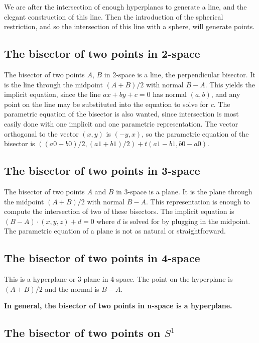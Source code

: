 \documentclass[12pt]{article}
\begin{document}
We are after the intersection of enough hyperplanes to generate a line,
and the elegant construction of this line.
Then the introduction of the spherical restriction, and so the intersection
of this line with a sphere, will generate points.

\clearpage

\subsection{The bisector of two points in 2-space}

The bisector of two points $A$, $B$ in 2-space is a line, the perpendicular bisector.
It is the line through the midpoint $(A+B)/2$ with normal $B-A$.
This yields the implicit equation, since the line $ax+by+c=0$ has normal $(a,b)$, 
and any point on the line may be substituted into the equation to solve for $c$.
The parametric equation of the bisector is also wanted, since intersection is
most easily done with one implicit and one parametric representation.
The vector orthogonal to the vector $(x,y)$ is $(-y,x)$, so the parametric equation
of the bisector is $((a0+b0)/2, (a1+b1)/2) + t(a1-b1,b0-a0)$.

\subsection{The bisector of two points in 3-space} 

The bisector of two points $A$ and $B$ in 3-space is a plane.
It is the plane through the midpoint $(A+B)/2$ with normal $B-A$.
This representation is enough to compute the intersection of two of these bisectors.
The implicit equation is $(B-A) \cdot (x,y,z) + d = 0$ where $d$ is solved for by plugging
in the midpoint.
The parametric equation of a plane is not as natural or straightforward.

\subsection{The bisector of two points in 4-space}

This is a hyperplane or 3-plane in 4-space.
The point on the hyperplane is $(A+B)/2$ and the normal is $B-A$.

{\bf In general, the bisector of two points in n-space is a hyperplane.}

\subsection{The bisector of two points on $S^1$}
\end{document}
